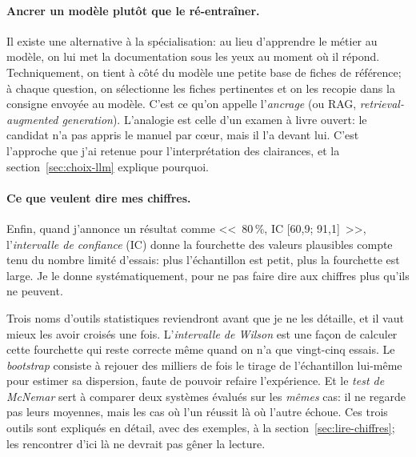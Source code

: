 \documentclass[11pt,a4paper]{article}
\begin{document}
\paragraph{Ancrer un modèle plutôt que le ré-entraîner.} Il existe une alternative à la spécialisation: au lieu d'apprendre le métier au modèle, on lui met la documentation sous les yeux au moment où il répond. Techniquement, on tient à côté du modèle une petite base de fiches de référence; à chaque question, on sélectionne les fiches pertinentes et on les recopie dans la consigne envoyée au modèle. C'est ce qu'on appelle l'\emph{ancrage} (ou RAG, \emph{retrieval-augmented generation}). L'analogie est celle d'un examen à livre ouvert: le candidat n'a pas appris le manuel par c\oe ur, mais il l'a devant lui. C'est l'approche que j'ai retenue pour l'interprétation des clairances, et la section~\ref{sec:choix-llm} explique pourquoi.

\paragraph{Ce que veulent dire mes chiffres.} Enfin, quand j'annonce un résultat comme <<~80\,\%, IC [60,9; 91,1]~>>, l'\emph{intervalle de confiance} (IC) donne la fourchette des valeurs plausibles compte tenu du nombre limité d'essais: plus l'échantillon est petit, plus la fourchette est large. Je le donne systématiquement, pour ne pas faire dire aux chiffres plus qu'ils ne peuvent.

Trois noms d'outils statistiques reviendront avant que je ne les détaille, et il vaut mieux les avoir croisés une fois. L'\emph{intervalle de Wilson} est une façon de calculer cette fourchette qui reste correcte même quand on n'a que vingt-cinq essais. Le \emph{bootstrap} consiste à rejouer des milliers de fois le tirage de l'échantillon lui-même pour estimer sa dispersion, faute de pouvoir refaire l'expérience. Et le \emph{test de McNemar} sert à comparer deux systèmes évalués sur les \emph{mêmes} cas: il ne regarde pas leurs moyennes, mais les cas où l'un réussit là où l'autre échoue. Ces trois outils sont expliqués en détail, avec des exemples, à la section~\ref{sec:lire-chiffres}; les rencontrer d'ici là ne devrait pas gêner la lecture.
\end{document}
